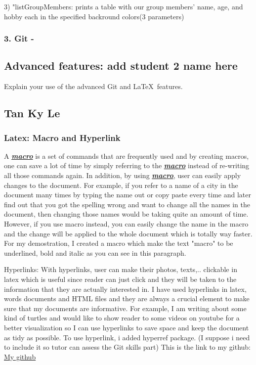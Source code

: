 \documentclass[a4paper, 11pt]{report}
\begin{document}
3) "listGroupMembers: prints a table with our group members' name, age, and hobby each in the specified backround colors(3  parameters)

\subsubsection{3. Git - }



\subsection{Advanced features: add student 2 name here}

Explain your use of the advanced Git and \LaTeX\ features. 

\subsection{Tan Ky Le}

\subsubsection{ Latex: Macro and Hyperlink}
\newcommand{\BoldandItalic}[0]{\textbf{\textit{ \underline{macro}}}}

A\BoldandItalic{} is a set of commands that are frequently used and by creating macros, one can save a lot of time by simply referring to the\BoldandItalic{} instead of re-writing all those commands again. In addition, by using\BoldandItalic{}, user can easily apply changes to the document. For example, if you refer to a name of a city in the document many times by typing the name out or copy paste every time and later find out that you got the spelling wrong and want to change all the names in the document, then changing those names would be taking quite an amount of time. However, if you use macro instead, you can easily change the name in the macro and the change will be applied to the whole document which is totally way faster. For my demostration, I created a macro which make the text "macro" to be underlined, bold and italic  as you can see in this paragraph.

Hyperlinks: With hyperlinks, user can make their photos, texts,.. clickable in latex which is useful since reader can just click and they will be taken to the information that they are actually interested in. I have used hyperlinks in latex, words documents and HTML files and they are always a crucial element to make sure that my documents are informative. For example, I am writing about some kind of turtles and would like to show reader to some videos on youtube for a better visualization so I can use hyperlinks to save space and keep the document as tidy as possible. To use hyperlink, i added hyperref package.
(I suppose i need to include it so tutor can assess the Git skills part) This is the link to my github: \href{https://github.com/Kyle240/testing.git}{My github}
\end{document}
